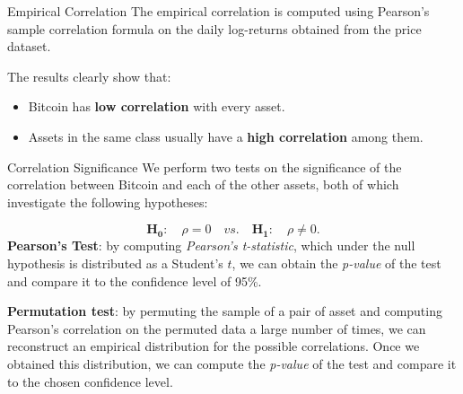 \documentclass[c, 10pt]{beamer}
\begin{document}
\begin{frame}{Empirical Correlation }
The empirical correlation is computed using Pearson's sample correlation formula on the daily log-returns obtained from the price dataset.
\begin{figure}
	\centering
     \noindent{}
\end{figure}

The results clearly show that:
\begin{itemize}
	\item Bitcoin has \textbf{low correlation} with every asset.
	\item Assets in the same class usually have a \textbf{high correlation} among them.
\end{itemize}
\end{frame}


\begin{frame}{Correlation Significance}
	We perform two tests on the significance of the correlation between Bitcoin and each of the other assets, both of which investigate the following hypotheses:

	\begin{equation*}
	\mathbf{H_{0}}: \quad \rho = 0 \quad vs. \quad	\mathbf{H_{1}}: \quad \rho \neq 0 .
	\end{equation*}
	\textbf{Pearson's Test}: by computing \textit{Pearson's  t-statistic}, which under the null hypothesis is distributed as a Student's $t$, we can obtain the \textit{p-value} of the test and compare it to the confidence level of 95\%.
	
	\bigskip
	\textbf{Permutation test}: by permuting the sample of a pair of asset and computing Pearson's correlation on the permuted data a large number of times, we can reconstruct an empirical distribution for the possible correlations. Once we obtained this distribution, we can compute the \textit{p-value} of the test and compare it to the chosen confidence level.
\end{frame}
	
\end{document}
